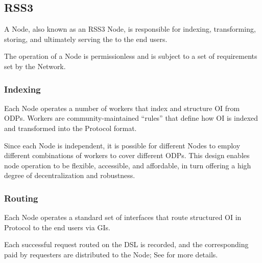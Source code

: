 \subsection{RSS3 }
\label{subsec:Node}

A \gls{Node}, also known as an RSS3 Node, is responsible for indexing, transforming, storing, and ultimately serving the  to the end users.

The operation of a \gls{Node} is permissionless and is subject to a set of requirements set by the Network.

\subsubsection{Indexing}
Each \gls{Node} operates a number of workers that index and structure \gls{OI} from \glspl{ODP}.
Workers are community-maintained ``rules'' that define how \gls{OI} is indexed and transformed into the \gls{Protocol} format.

Since each \gls{Node} is independent, it is possible for different \glspl{Node} to employ different combinations of workers to cover different \glspl{ODP}.
This design enables node operation to be flexible, accessible, and affordable, in turn offering a high degree of decentralization and robustness.

\subsubsection{Routing}
Each \gls{Node} operates a standard set of interfaces that route structured \gls{OI} in \gls{Protocol} to the end users via \glspl{GI}.

Each successful request routed on the \gls{DSL} is recorded, and the corresponding  paid by requesters are distributed to the \gls{Node};
See  for more details.
